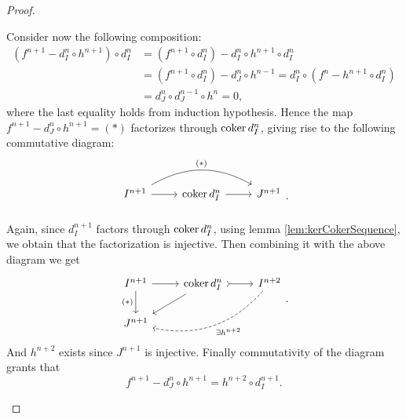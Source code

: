 \documentclass[../Main]{subfiles}
\begin{document}
\begin{proof}
\begin{description}
	Consider now the following composition:
	\begin{align}
		(f^{n+1} - d_I^n \circ h^{n+1}) \circ d_I^n &=
		(f^{n+1} \circ d_I^n) - d_I^n \circ h^{n+1} \circ d_I^n\\
		&=
		\left( f^{n+1} \circ d_I^n \right) - d_J^n \circ h^{n-1} =
		d^n_I \circ \left( f^n - h^{n+1} \circ d_I^n \right)\nonumber\\
		&=
		d^n_J \circ d_J^{n-1} \circ h^n = 0\nonumber
	,\end{align} 
	where the last equality holds from induction hypothesis.
	Hence the map $f^{n+1} - d_J^n \circ h^{n+1} = (*)$ 
	factorizes through $\operatorname{coker} d^n_I$,
	giving rise to the following commutative diagram:
	\begin{equation}
		\begin{tikzcd}[row sep=small]
		I^{n+1} \arrow[r, "", rightarrow] \arrow[rr, "(*)", bend left, rightarrow] &
		\coker d_I^n \arrow[r, "", rightarrow] &
		J^{n+1}\\
	\end{tikzcd}
	.\end{equation} 
	Again, since $d^{n+1}_I$ factors through $\operatorname{coker} d^n_I$,
	using lemma \ref{lem:kerCokerSequence}, we obtain that the factorization is injective.
	Then combining it with the above diagram we get
	\begin{equation}
	\begin{tikzcd}
		I^{n+1} \arrow[r, "", rightarrow] \arrow[d, "(*)"', rightarrow] &
		\coker d_I^{n} \arrow[r, "", rightarrowtail] 
		\arrow[ld, "", rightarrow] &
		I^{n+2} \arrow[dll, "\exists h^{n+2}", dashrightarrow, bend left] \\
		J^{n+1}
	\end{tikzcd}
	.\end{equation} 		
	And $h^{n+2}$ exists since $J^{n+1}$ is injective.
	Finally commutativity of the diagram grants that
	\begin{equation}
	f^{n+1} - d^n_J \circ h^{n+1} = h^{n+2} \circ d_I^{n+1}
	.\end{equation} 


\end{description}
\end{proof}
\end{document}
